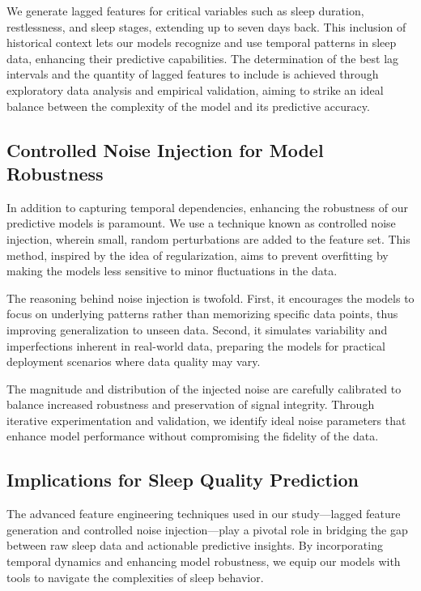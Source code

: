 \documentclass[10pt]{extarticle}
\begin{document}
We generate lagged features for critical variables such as sleep duration, restlessness, and sleep stages, extending up to seven days back. This inclusion of historical context lets our models recognize and use temporal patterns in sleep data, enhancing their predictive capabilities. The determination of the best lag intervals and the quantity of lagged features to include is achieved through exploratory data analysis and empirical validation, aiming to strike an ideal balance between the complexity of the model and its predictive accuracy.

\subsection{Controlled Noise Injection for Model Robustness}

In addition to capturing temporal dependencies, enhancing the robustness of our predictive models is paramount. We use a technique known as controlled noise injection, wherein small, random perturbations are added to the feature set. This method, inspired by the idea of regularization, aims to prevent overfitting by making the models less sensitive to minor fluctuations in the data.

The reasoning behind noise injection is twofold. First, it encourages the models to focus on underlying patterns rather than memorizing specific data points, thus improving generalization to unseen data. Second, it simulates variability and imperfections inherent in real-world data, preparing the models for practical deployment scenarios where data quality may vary.

The magnitude and distribution of the injected noise are carefully calibrated to balance increased robustness and preservation of signal integrity. Through iterative experimentation and validation, we identify ideal noise parameters that enhance model performance without compromising the fidelity of the data.

\subsection{Implications for Sleep Quality Prediction}

The advanced feature engineering techniques used in our study—lagged feature generation and controlled noise injection—play a pivotal role in bridging the gap between raw sleep data and actionable predictive insights. By incorporating temporal dynamics and enhancing model robustness, we equip our models with tools to navigate the complexities of sleep behavior.
\end{document}
